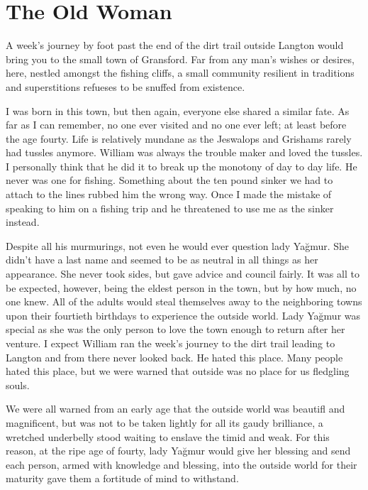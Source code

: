 \chapter*{The Old Woman}


A week's journey by foot past the end of the dirt trail outside Langton would bring you to the small
town of Gransford. Far from any man's wishes or desires, here, nestled amongst the fishing
cliffs, a small community resilient in traditions and superstitions refueses to be snuffed from
existence.

I was born in this town, but then again, everyone else shared a similar fate. As far as I can
remember, no one ever visited and no one ever left; at least before the age fourty. Life is
relatively mundane as the Jeswalops and Grishams rarely had tussles anymore. William was always the
trouble maker and loved the tussles. I personally think that he did it to break up the monotony of
day to day life. He never was one for fishing. Something about the ten pound sinker we had to attach
to the lines rubbed him the wrong way. Once I made the mistake of speaking to him on a fishing trip
and he threatened to use me as the sinker instead.

Despite all his murmurings, not even he would ever question lady Yağmur. She didn't have a last name
and seemed to be as neutral in all things as her appearance. She never took sides, but gave advice
and council fairly. It was all to be expected, however, being the eldest person in the town, but by
how much, no one knew. All of the adults would steal themselves away to the neighboring towns upon
their fourtieth birthdays to experience the outside world. Lady Yağmur was special as she was the
only person to love the town enough to return after her venture. I expect William ran the week's
journey to the dirt trail leading to Langton and from there never looked back. He hated this place.
Many people hated this place, but we were warned that outside was no place for us fledgling souls.

We were all warned from an early age that the outside world was beautifl and magnificent, but was
not to be taken lightly for all its gaudy brilliance, a wretched underbelly stood waiting to enslave
the timid and weak. For this reason, at the ripe age of fourty, lady Yağmur would give her blessing
and send each person, armed with knowledge and blessing, into the outside world for their maturity
gave them a fortitude of mind to withstand.

